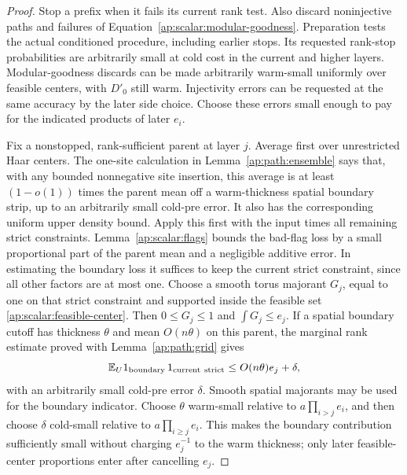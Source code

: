 \begin{proof}
Stop a prefix when it fails its current rank test. Also discard
noninjective paths and failures of
Equation~\eqref{ap:scalar:modular-goodness}. Preparation tests the
actual conditioned procedure, including earlier stops. Its requested
rank-stop probabilities are arbitrarily small at cold cost in the
current and higher layers. Modular-goodness discards can be made
arbitrarily warm-small uniformly over feasible centers, with $D'_0$
still warm. Injectivity errors can be requested at the same accuracy
by the later side choice. Choose these errors small enough to pay for
the indicated products of later $e_i$.

Fix a nonstopped, rank-sufficient parent at layer $j$. Average first
over unrestricted Haar centers. The one-site calculation in
Lemma~\ref{ap:path:ensemble} says that, with any bounded nonnegative
site insertion, this average is at least $(1-o(1))$ times the parent
mean off a warm-thickness spatial boundary strip, up to an arbitrarily
small cold-pre error. It also has the corresponding uniform upper
density bound. Apply this first with the input times all remaining
strict constraints. Lemma~\ref{ap:scalar:flags} bounds the bad-flag
loss by a small proportional part of the parent mean and a negligible
additive error. In estimating the boundary loss it suffices to keep
the current strict constraint, since all other factors are at most
one. Choose a smooth torus majorant $G_j$, equal to one on that
strict constraint and supported inside the feasible set
\eqref{ap:scalar:feasible-center}. Then $0\le G_j\le1$ and
$\int G_j\le e_j$. If a spatial boundary cutoff has thickness
$\theta$ and mean $O(n\theta)$ on this parent, the marginal rank
estimate proved with Lemma~\ref{ap:path:grid} gives
\[
 \mathbb E_U 1_{\rm boundary}\,1_{\rm current\ strict}
       \le O(n\theta)e_j+\delta,
\]
with an arbitrarily small cold-pre error $\delta$. Smooth spatial
majorants may be used for the boundary indicator. Choose
$\theta$ warm-small relative to $a\prod_{i>j}e_i$, and then choose
$\delta$ cold-small relative to $a\prod_{i\ge j}e_i$.
This makes the boundary contribution sufficiently small without
charging $e_j^{-1}$ to the warm thickness; only later feasible-center
proportions enter after cancelling $e_j$.


\end{proof}
